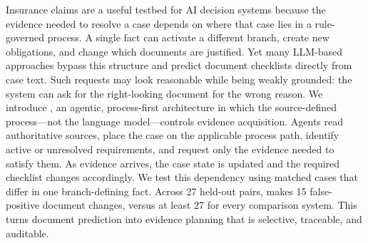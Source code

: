 Insurance claims are a useful testbed for AI decision systems because the evidence needed to resolve a case depends on where that case lies in a rule-governed process. A single fact can activate a different branch, create new obligations, and change which documents are justified. Yet many LLM-based approaches bypass this structure and predict document checklists directly from case text. Such requests may look reasonable while being weakly grounded: the system can ask for the right-looking document for the wrong reason. We introduce \casepath, an agentic, process-first architecture in which the source-defined process—not the language model—controls evidence acquisition. Agents read authoritative sources, place the case on the applicable process path, identify active or unresolved requirements, and request only the evidence needed to satisfy them. As evidence arrives, the case state is updated and the required checklist changes accordingly. We test this dependency using matched cases that differ in one branch-defining fact. Across 27 held-out pairs, \casepath makes 15 false-positive document changes, versus at least 27 for every comparison system. This turns document prediction into evidence planning that is selective, traceable, and auditable.
